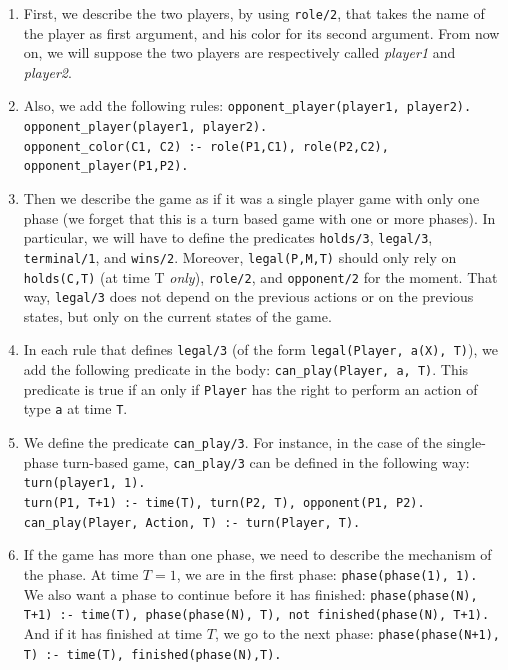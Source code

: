 \begin{enumerate}
\item First, we describe the two players, by using \texttt{role/2}, that takes the name of the player as first argument, and his color for its second argument. From now on, we will suppose the two players are respectively called \textit{player1} and \textit{player2}.  

\item Also, we add the following rules: \newline
\texttt{opponent\_player(player1, player2).\\
opponent\_player(player1, player2).\\
opponent\_color(C1, C2) :- role(P1,C1), role(P2,C2), opponent\_player(P1,P2).}

\item Then we describe the game as if it was a single player game with only one phase \citep{thielscher2009answer} (we forget that this is a turn based game with one or more phases). In particular, we will have to define the predicates \texttt{holds/3}, \texttt{legal/3}, \texttt{terminal/1}, and \texttt{wins/2}. Moreover,  \texttt{legal(P,M,T)} should only rely on \texttt{holds(C,T)} (at time T \textit{only}), \texttt{role/2}, and \texttt{opponent/2} for the moment. That way, \texttt{legal/3} does not depend on the previous actions or on the previous states, but only on the current states of the game.

\item In each rule that defines \texttt{legal/3} (of the form \texttt{legal(Player, a(X), T)}), we add the following predicate in the body: \texttt{can\_play(Player, a, T)}. This predicate is true if an only if \texttt{Player} has the right to perform an action of type \texttt{a} at time \texttt{T}. 

\item We define the predicate \texttt{can\_play/3}. For instance, in the case of the single-phase turn-based game, \texttt{can\_play/3} can be defined in the following way:\newline
\texttt{turn(player1, 1). }\\
\texttt{turn(P1, T+1) :- time(T), turn(P2, T), opponent(P1, P2).}\\
\texttt{can\_play(Player, Action, T) :- turn(Player, T).}


\item If the game has more than one phase, we need to describe the mechanism of the phase. At time $T=1$, we are in the first phase:\newline
\texttt{phase(phase(1), 1).}\\
We also want a phase to continue before it has finished:\newline
\texttt{phase(phase(N), T+1) :- time(T), phase(phase(N), T), not finished(phase(N), T+1).}\\
And if it has finished at time $T$, we go to the next phase:\newline
\texttt{phase(phase(N+1), T) :- time(T), finished(phase(N),T).}


\end{enumerate}

